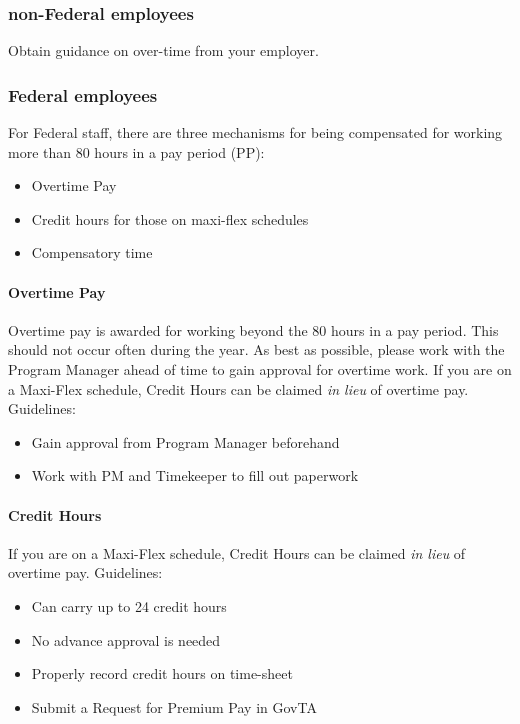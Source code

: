 \documentclass[
  letterpaper,
  DIV=11,
  numbers=noendperiod]{scrreprt}
\let\oldparagraph\paragraph
\renewcommand{\paragraph}[1]{\oldparagraph{#1}\mbox{}}
\providecommand{\tightlist}{%
  \setlength{\itemsep}{0pt}\setlength{\parskip}{0pt}}\usepackage{longtable,booktabs,array}
\begin{document}
\subsubsection{non-Federal employees}\label{non-federal-employees-2}

Obtain guidance on over-time from your employer.

\subsubsection{Federal employees}\label{federal-employees-2}

For Federal staff, there are three mechanisms for being compensated for
working more than 80 hours in a pay period (PP):

\begin{itemize}
\tightlist
\item
  Overtime Pay
\item
  Credit hours for those on maxi-flex schedules
\item
  Compensatory time
\end{itemize}

\paragraph{Overtime Pay}\label{overtime-pay}

Overtime pay is awarded for working beyond the 80 hours in a pay period.
This should not occur often during the year. As best as possible, please
work with the Program Manager ahead of time to gain approval for
overtime work. If you are on a Maxi-Flex schedule, Credit Hours can be
claimed \emph{in lieu} of overtime pay. Guidelines:

\begin{itemize}
\tightlist
\item
  Gain approval from Program Manager beforehand
\item
  Work with PM and Timekeeper to fill out paperwork
\end{itemize}

\paragraph{Credit Hours}\label{credit-hours}

If you are on a Maxi-Flex schedule, Credit Hours can be claimed \emph{in
lieu} of overtime pay. Guidelines:

\begin{itemize}
\tightlist
\item
  Can carry up to 24 credit hours\\
\item
  No advance approval is needed\\
\item
  Properly record credit hours on time-sheet\\
\item
  Submit a Request for Premium Pay in GovTA
\end{itemize}
\end{document}
